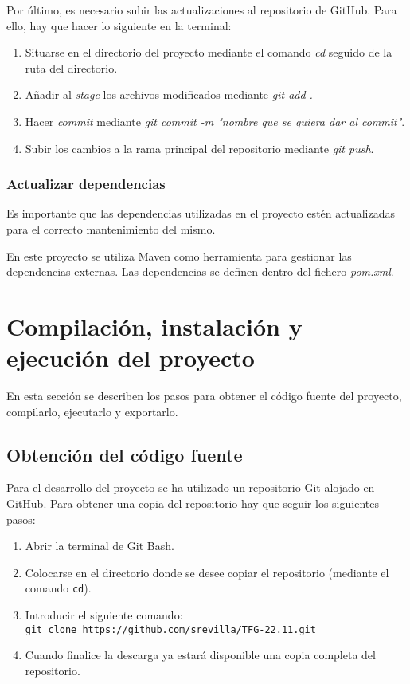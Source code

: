 Por último, es necesario subir las actualizaciones al repositorio de GitHub. Para ello, hay que hacer lo siguiente en la terminal:
\begin{enumerate}
    \item Situarse en el directorio del proyecto mediante el comando \textit{cd} seguido de la ruta del directorio.
    \item Añadir al \textit{stage} los archivos modificados mediante \textit{git add .}
    \item Hacer \textit{commit} mediante \textit{git commit -m "nombre que se quiera dar al commit"}.
    \item Subir los cambios a la rama principal del repositorio mediante \textit{git push}.
\end{enumerate}

\subsubsection{Actualizar dependencias}

Es importante que las dependencias utilizadas en el proyecto estén actualizadas para el correcto mantenimiento del mismo. 

En este proyecto se utiliza Maven como herramienta para gestionar las dependencias externas. Las dependencias se definen dentro del fichero \textit{pom.xml}.


\section{Compilación, instalación y ejecución del proyecto}
En esta sección se describen los pasos para obtener el código fuente del proyecto, compilarlo, ejecutarlo y exportarlo.

\subsection{Obtención del código fuente}
Para el desarrollo del proyecto se ha utilizado un repositorio Git alojado en GitHub. Para obtener una copia del repositorio hay que seguir los siguientes pasos:

\begin{enumerate}
\item Abrir la terminal de Git Bash.
\item Colocarse en el directorio donde se desee copiar el repositorio (mediante el comando \texttt{cd}).
\item Introducir el siguiente comando:\\\texttt{git\ clone\ https://github.com/srevilla/TFG-22.11.git}
\item Cuando finalice la descarga ya estará disponible una copia completa del repositorio.
\end{enumerate}

